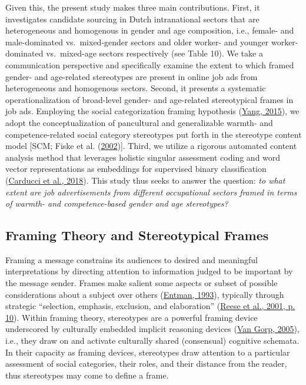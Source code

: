 \documentclass[
  12pt,
  letterpaper,
  DIV=11,
  numbers=noendperiod]{scrartcl}
\begin{document}
Given this, the present study makes three main contributions. First, it
investigates candidate sourcing in Dutch intranational sectors that are
heterogeneous and homogenous in gender and age composition, i.e.,
female- and male-dominated vs.~mixed-gender sectors and older worker-
and younger worker-dominated vs.~mixed-age sectors respectively (see
Table 10). We take a communication perspective and specifically examine
the extent to which framed gender- and age-related stereotypes are
present in online job ads from heterogeneous and homogenous sectors.
Second, it presents a systematic operationalization of broad-level
gender- and age-related stereotypical frames in job ads. Employing the
social categorization framing hypothesis
(\protect\hyperlink{ref-Yang2015a}{Yang, 2015}), we adopt the
conceptualization of pancultural and generalizable warmth- and
competence-related social category stereotypes put forth in the
stereotype content model {[}SCM; Fiske et al.
(\protect\hyperlink{ref-fiske2002ModelOftenMixed}{2002}){]}. Third, we
utilize a rigorous automated content analysis method that leverages
holistic singular assessment coding and word vector representations as
embeddings for supervised binary classification
(\protect\hyperlink{ref-carducci_twitpersonality_2018}{Carducci et al.,
2018}). This study thus seeks to answer the question: \emph{to what
extent are job advertisements from different occupational sectors framed
in terms of warmth- and competence-based gender and age stereotypes?}

\hypertarget{framing}{%
\subsection{Framing Theory and Stereotypical Frames}\label{framing}}

Framing a message constrains its audiences to desired and meaningful
interpretations by directing attention to information judged to be
important by the message sender. Frames make salient some aspects or
subset of possible considerations about a subject over others
(\protect\hyperlink{ref-entman1993FramingClarificationFractured}{Entman,
1993}), typically through strategic ``selection, emphasis, exclusion,
and elaboration''
(\protect\hyperlink{ref-reese2001FramingPublicLife}{Reese et al., 2001,
p. 10}). Within framing theory, stereotypes are a powerful framing
device underscored by culturally embedded implicit reasoning devices
(\protect\hyperlink{ref-vangorp2005WhereFrameVictims}{Van Gorp, 2005}),
i.e., they draw on and activate culturally shared (consensual) cognitive
schemata. In their capacity as framing devices, stereotypes draw
attention to a particular assessment of social categories, their roles,
and their distance from the reader, thus stereotypes may come to define
a frame.
\end{document}
